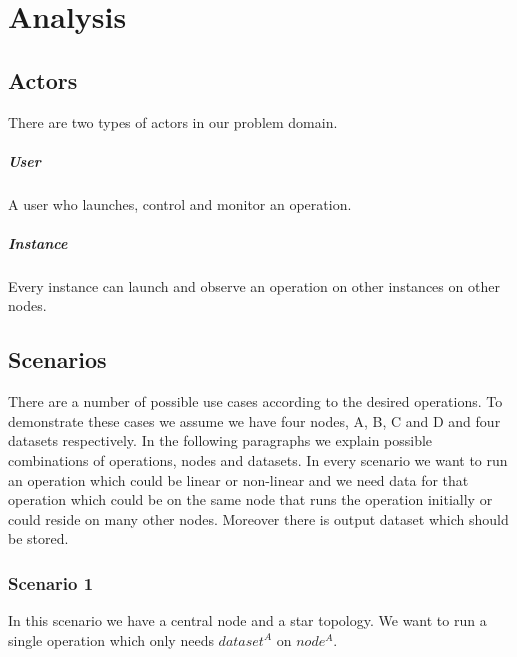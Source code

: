 \section{Analysis}

\subsection{Actors}
There are two types of actors in our problem domain.
\subparagraph{User}
A user who launches, control and monitor an operation.
\subparagraph{Instance}
Every instance can launch and observe an operation on other instances on other nodes.

\subsection{Scenarios}
There are a number of possible use cases according to the desired operations. To demonstrate these cases we assume
we have four nodes, A, B, C and D and four datasets respectively. In the following paragraphs we explain possible
combinations of operations, nodes and datasets. In every scenario we want to run an operation which could be
linear or non-linear and we need data for that operation which could be on the same node that runs the operation
initially or could reside on many other nodes. Moreover there is output dataset which should be stored.

\subsubsection{Scenario 1}
In this scenario we have a central node and a star topology. We want to run a single operation which only needs 
\( dataset^A \) on \( node^A \).


